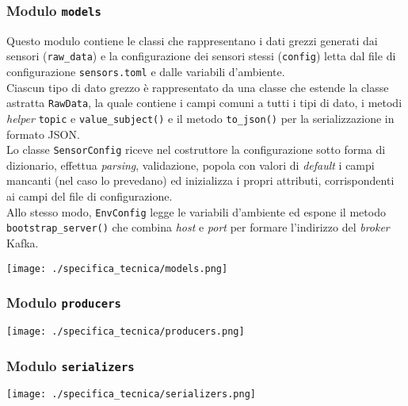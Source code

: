 \subsubsection{Modulo \texttt{models}}
Questo modulo contiene le classi che rappresentano i dati grezzi generati dai sensori (\texttt{raw\_data}) e la configurazione dei sensori stessi (\texttt{config}) letta
dal file di configurazione \texttt{sensors.toml} e dalle variabili d'ambiente.\\
Ciascun tipo di dato grezzo è rappresentato da una classe che estende la classe astratta \texttt{RawData}, la quale contiene i campi comuni a tutti i tipi di dato,
i metodi \textit{helper} \texttt{topic} e \texttt{value\_subject()} e il metodo \texttt{to\_json()} per la serializzazione in formato JSON.\\
Lo classe \texttt{SensorConfig} riceve nel costruttore la configurazione sotto forma di dizionario, effettua \textit{parsing}, validazione,
popola con valori di \textit{default} i campi mancanti (nel caso lo prevedano) ed inizializza i propri attributi, corrispondenti ai campi del file di configurazione.\\
Allo stesso modo, \texttt{EnvConfig} legge le variabili d'ambiente ed espone il metodo \texttt{bootstrap\_server()} che combina \textit{host} e \textit{port} per formare l'indirizzo del \textit{broker} Kafka.\\

\begin{center}
	\texttt{[image: ./specifica\_tecnica/models.png]}
\end{center}


\subsubsection{Modulo \texttt{producers}}
\begin{center}
	\texttt{[image: ./specifica\_tecnica/producers.png]}
\end{center}

\subsubsection{Modulo \texttt{serializers}}
\begin{center}
	\texttt{[image: ./specifica\_tecnica/serializers.png]}
\end{center}

